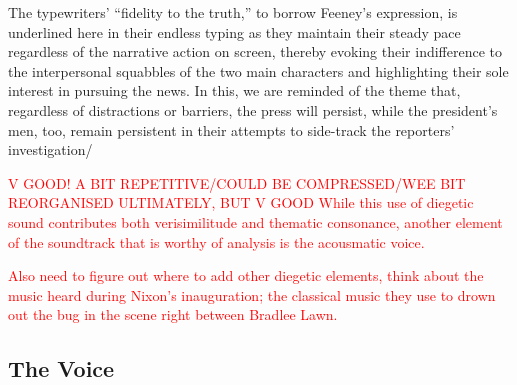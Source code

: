 The typewriters’ ``fidelity to the truth,” to borrow Feeney’s expression, is underlined here in their endless typing as they maintain their steady pace regardless of the narrative action on screen, thereby evoking their indifference to the interpersonal squabbles of the two main characters and highlighting their sole interest in pursuing the news.
In this, we are reminded of the theme that, regardless of distractions or barriers, the press will persist, while the president’s men, too, remain persistent in their attempts to side-track the reporters’ investigation/

\textcolor{red}{V GOOD! A BIT REPETITIVE/COULD BE COMPRESSED/WEE BIT REORGANISED ULTIMATELY, BUT V GOOD
While this use of diegetic sound contributes both verisimilitude and thematic consonance, another element of the soundtrack that is worthy of analysis is the acousmatic voice.

Also need to figure out where to add other diegetic elements, think about the music heard during Nixon's inauguration; the classical music they use to drown out the bug in the scene right between Bradlee Lawn.}




\subsection{The Voice}

